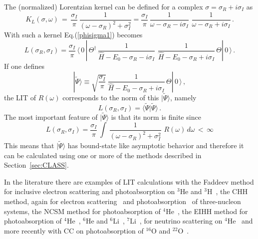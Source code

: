 The (normalized) Lorentzian kernel can be defined for a complex $\sigma=\sigma_R+i\sigma_I$ as 
\begin{equation}
 K_L(\sigma,\omega)\,=\, \frac{\sigma_I}{\pi}\,\frac{1}{(\omega-\sigma_R)^2+\sigma_I^2}=
 \frac{\sigma_I}{\pi}\,\frac{1}{\omega-\sigma_R-i\sigma_I}\,\,\frac{1}{\omega-\sigma_R+i\sigma_I}\,.
\end{equation}
With such a kernel Eq.(\ref{phisigma1}) becomes
\begin{equation}\label{Lsr}
L(\sigma_R,\sigma_I)= \frac{\sigma_I}{\pi}\,\langle\,0\,|\,\Theta^\dagger \,
\frac{1}{\hat H -E_0 -\sigma_R-i\sigma_I}\,\,\frac{1}{\hat H -E_0 -\sigma_R+i\sigma_I}\,\Theta|\,0\,\rangle\,.
\end{equation}
If one defines
\begin{equation}\label{psitilde}
|\tilde\Psi\rangle\equiv\sqrt{\frac{\sigma_I}{\pi}}\,\frac{1}{\hat H -E_0-\sigma_R+i\sigma_I}\,\Theta|\,0\,\rangle\,,
\end{equation}
the LIT of $R(\omega)$ corresponds to the norm of this $|\tilde\Psi\rangle$, namely
\begin{equation}\label{norm}
L(\sigma_R,\sigma_I)=\langle\tilde\Psi |\tilde\Psi\rangle\,.
\end{equation}
The most important feature of $|\tilde\Psi\rangle$ is that its norm is finite since 
\begin{equation}
L(\sigma_R,\sigma_I)=\frac{\sigma_I}{\pi}\,\int\,\frac{1}{(\omega-\sigma_R)^2+\sigma_I^2}\,\,R(\omega) \,d\omega\,<\,\infty
\label{phiL}
\end{equation}
This means that $|\tilde\Psi\rangle$ has bound-state like asymptotic behavior and therefore it can be calculated using one or more 
of the methods described in Section~\ref{sec:CLASS}. 

In the literature there are examples of LIT calculations  with 
 the Faddeev method for inclusive electron scattering\cite{Sara95} and photoabsorption on $^3$He and $^3$H~\cite{Golak_Benchmark2002}, 
 the CHH method, again for electron scattering~\cite{long3H_2004} and photoabsorption~\cite{accuracy_2006}
 of three-nucleon systems,
 the NCSM method for  photoabsorption of $^4$He~\cite{Stetcu_2005}, 
 the EIHH method for  photoabsorption of $^4$He~\cite{Gazit_2006}, $^6$He and $^6$Li~\cite{He6_2004}, $^7$Li~\cite{Li7_2004}, 
for neutrino scattering  on $^4$He~\cite{neutrino_2007} and more recently with CC on photoabsorption of $^{16}$O and 
 $^{22}$O~\cite{CC_O16}. 


